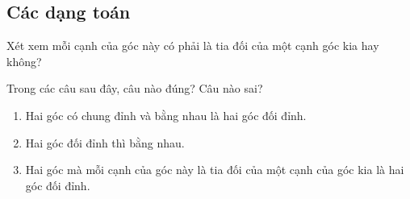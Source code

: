 \subsection{Các dạng toán}
\begin{dang}
Xét xem mỗi cạnh của góc này có phải là tia đối của một cạnh góc kia hay không?
\end{dang}

\begin{vd}
	Trong các câu sau đây, câu nào đúng? Câu nào sai?
	\begin{enumerate}
		\item {} Hai góc có chung đỉnh và bằng nhau là hai góc đối đỉnh.
		\item {} Hai góc đối đỉnh thì bằng nhau.
		\item {} Hai góc mà mỗi cạnh của góc này là tia đối của một cạnh của góc kia là hai góc đối đỉnh.
	\end{enumerate}
\end{vd}


